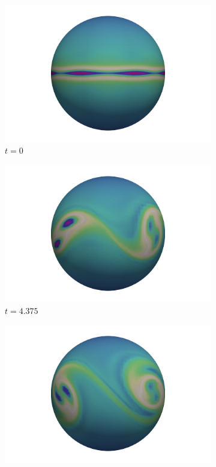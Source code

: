 \documentclass{article}
\begin{document}
\begin{figure}[h]
	\centering
	\begin{subfigure}[b]{0.15\textwidth}
		\includegraphics[scale=0.1]{images/w0.png}
		\caption{$t=0$}
	\end{subfigure} 
	\begin{subfigure}[b]{0.15\textwidth}
		\includegraphics[scale=0.1]{images/w4375.png}
		\caption{$t=4.375$}
	\end{subfigure}
	\begin{subfigure}[b]{0.15\textwidth}
		\includegraphics[scale=0.1]{images/w5.png}

\end{subfigure}
\end{figure}
\end{document}
